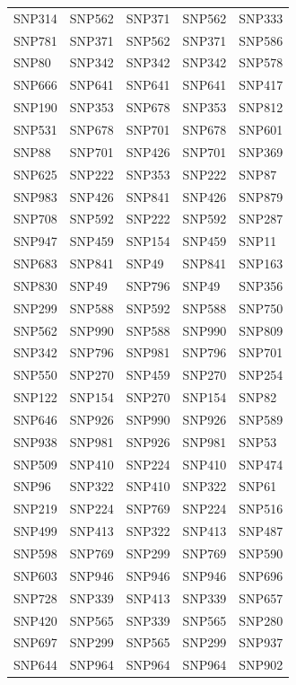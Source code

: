 \begin{table}[ht]
\begin{tabular}{lllll}
  SNP314 & SNP562 & SNP371 & SNP562 & SNP333 \\ 
  SNP781 & SNP371 & SNP562 & SNP371 & SNP586 \\ 
  SNP80 & SNP342 & SNP342 & SNP342 & SNP578 \\ 
  SNP666 & SNP641 & SNP641 & SNP641 & SNP417 \\ 
  SNP190 & SNP353 & SNP678 & SNP353 & SNP812 \\ 
  SNP531 & SNP678 & SNP701 & SNP678 & SNP601 \\ 
  SNP88 & SNP701 & SNP426 & SNP701 & SNP369 \\ 
  SNP625 & SNP222 & SNP353 & SNP222 & SNP87 \\ 
  SNP983 & SNP426 & SNP841 & SNP426 & SNP879 \\ 
  SNP708 & SNP592 & SNP222 & SNP592 & SNP287 \\ 
  SNP947 & SNP459 & SNP154 & SNP459 & SNP11 \\ 
  SNP683 & SNP841 & SNP49 & SNP841 & SNP163 \\ 
  SNP830 & SNP49 & SNP796 & SNP49 & SNP356 \\ 
  SNP299 & SNP588 & SNP592 & SNP588 & SNP750 \\ 
  SNP562 & SNP990 & SNP588 & SNP990 & SNP809 \\ 
  SNP342 & SNP796 & SNP981 & SNP796 & SNP701 \\ 
  SNP550 & SNP270 & SNP459 & SNP270 & SNP254 \\ 
  SNP122 & SNP154 & SNP270 & SNP154 & SNP82 \\ 
  SNP646 & SNP926 & SNP990 & SNP926 & SNP589 \\ 
  SNP938 & SNP981 & SNP926 & SNP981 & SNP53 \\ 
  SNP509 & SNP410 & SNP224 & SNP410 & SNP474 \\ 
  SNP96 & SNP322 & SNP410 & SNP322 & SNP61 \\ 
  SNP219 & SNP224 & SNP769 & SNP224 & SNP516 \\ 
  SNP499 & SNP413 & SNP322 & SNP413 & SNP487 \\ 
  SNP598 & SNP769 & SNP299 & SNP769 & SNP590 \\ 
  SNP603 & SNP946 & SNP946 & SNP946 & SNP696 \\ 
  SNP728 & SNP339 & SNP413 & SNP339 & SNP657 \\ 
  SNP420 & SNP565 & SNP339 & SNP565 & SNP280 \\ 
  SNP697 & SNP299 & SNP565 & SNP299 & SNP937 \\ 
  SNP644 & SNP964 & SNP964 & SNP964 & SNP902 \\ 

\end{tabular}
\end{table}
